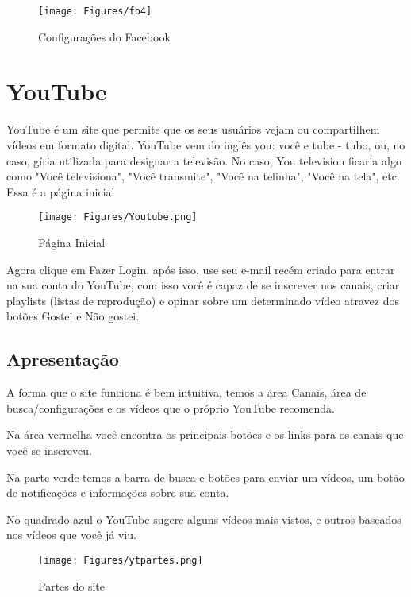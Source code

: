 \documentclass[hidelinks,12pt]{article}
\begin{document}
		\begin{figure}[!h]
			\centering
			\texttt{[image: Figures/fb4]}
			\label{fig:config}
			\caption{Configurações do Facebook}
		\end{figure}
	
	\newpage
	
	\section{YouTube}
	YouTube é um site que permite que os seus usuários vejam ou compartilhem vídeos em formato digital. YouTube vem do inglês you: você e tube - tubo, ou, no caso, gíria utilizada para designar a televisão. No caso, You television ficaria algo como "Você televisiona", "Você transmite", "Você na telinha", "Você na tela", etc. Essa é a página inicial
	
	\begin{figure}[!h]
		\centering
		\texttt{[image: Figures/Youtube.png]}
		\label{fig:config}
		\caption{Página Inicial}
	\end{figure}
	
	
	Agora clique em Fazer Login, após isso, use seu e-mail recém criado para entrar na sua conta do YouTube, com isso você é capaz de se inscrever nos canais, criar playlists (listas de reprodução) e opinar sobre um determinado vídeo atravez dos botões Gostei e Não gostei.
	
	\newpage
	\subsection{Apresentação}
	A forma que o site funciona é bem intuitiva, temos a área Canais, área de busca/configurações e os vídeos que o próprio YouTube recomenda.
	
	Na área vermelha você encontra os principais botões e os links para os canais que você se inscreveu.
	
	Na parte verde temos a barra de busca e botões para enviar um vídeos, um botão de notificações e informações sobre sua conta.
	
	No quadrado azul o YouTube sugere alguns vídeos mais vistos, e outros baseados nos vídeos que você já viu.
	
	\begin{figure}[!h]
		\centering
		\texttt{[image: Figures/ytpartes.png]}
		\label{fig:config}
		\caption{Partes do site}
	\end{figure}

	\newpage
\end{document}
